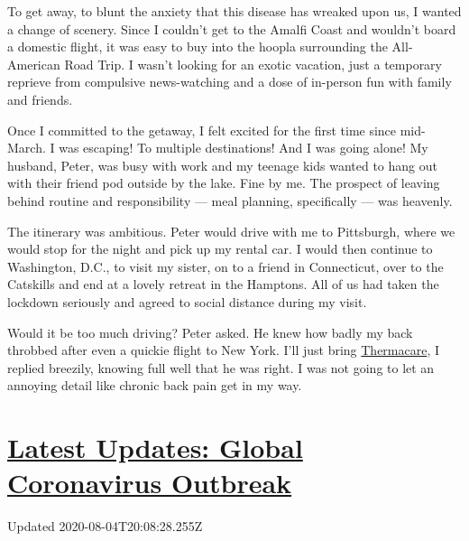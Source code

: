 To get away, to blunt the anxiety that this disease has wreaked upon us,
I wanted a change of scenery. Since I couldn't get to the Amalfi Coast
and wouldn't board a domestic flight, it was easy to buy into the hoopla
surrounding the All-American Road Trip. I wasn't looking for an exotic
vacation, just a temporary reprieve from compulsive news-watching and a
dose of in-person fun with family and friends.

Once I committed to the getaway, I felt excited for the first time since
mid-March. I was escaping! To multiple destinations! And I was going
alone! My husband, Peter, was busy with work and my teenage kids wanted
to hang out with their friend pod outside by the lake. Fine by me. The
prospect of leaving behind routine and responsibility --- meal planning,
specifically --- was heavenly.

The itinerary was ambitious. Peter would drive with me to Pittsburgh,
where we would stop for the night and pick up my rental car. I would
then continue to Washington, D.C., to visit my sister, on to a friend in
Connecticut, over to the Catskills and end at a lovely retreat in the
Hamptons. All of us had taken the lockdown seriously and agreed to
social distance during my visit.

Would it be too much driving? Peter asked. He knew how badly my back
throbbed after even a quickie flight to New York. I'll just bring
\href{https://www.thermacare.com/heat-wraps/back-pain-therapy}{Thermacare},
I replied breezily, knowing full well that he was right. I was not going
to let an annoying detail like chronic back pain get in my way.

\hypertarget{latest-updates-global-coronavirus-outbreak}{%
\section{\texorpdfstring{\href{https://www.nytimes.com/2020/08/04/world/coronavirus-cases.html?action=click\&pgtype=Article\&state=default\&region=MAIN_CONTENT_1\&context=storylines_live_updates}{Latest
Updates: Global Coronavirus
Outbreak}}{Latest Updates: Global Coronavirus Outbreak}}\label{latest-updates-global-coronavirus-outbreak}}

Updated 2020-08-04T20:08:28.255Z

